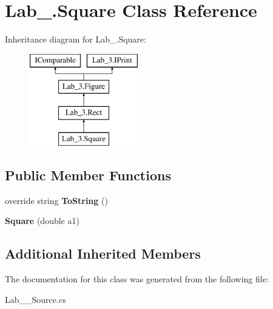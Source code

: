 \hypertarget{class_lab__3_1_1_square}{}\section{Lab\+\_.\+Square Class Reference}
\label{class_lab__3_1_1_square}
Inheritance diagram for Lab\+\_.\+Square\+:\begin{figure}[H]
\begin{center}
\leavevmode
\includegraphics[height=4.000000cm]{class_lab__3_1_1_square}
\end{center}
\end{figure}
\subsection*{Public Member Functions}
\begin{DoxyCompactItemize}
\item 
\mbox{\label{class_lab__3_1_1_square_a1326003724f6f8dee493a8f98c8e797b}} 
override string {\bfseries To\+String} ()
\item 
\mbox{\label{class_lab__3_1_1_square_a9fefca730022f798f20b958f1a62b3d7}} 
{\bfseries Square} (double a1)
\end{DoxyCompactItemize}
\subsection*{Additional Inherited Members}


The documentation for this class was generated from the following file\+:\begin{DoxyCompactItemize}
\item 
Lab\+\_\+\_\+\+Source.\+cs\end{DoxyCompactItemize}
